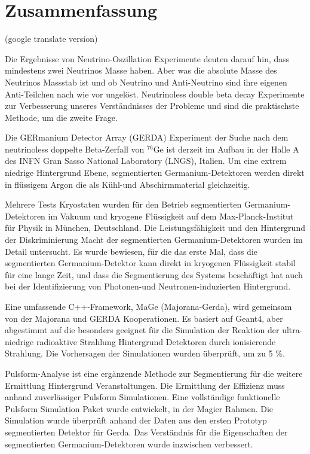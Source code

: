 \section*{Zusammenfassung}
(google translate version)

Die Ergebnisse von Neutrino-Oszillation Experimente deuten darauf hin, dass mindestens zwei Neutrinos Masse haben. Aber was die absolute Masse des Neutrinos Massstab ist und ob Neutrino und Anti-Neutrino sind ihre eigenen Anti-Teilchen nach wie vor ungel\"ost. Neutrinoless double beta decay Experimente zur Verbesserung unseres Verst\"andnisses der Probleme und sind die praktischste Methode, um die zweite Frage.

Die GERmanium Detector Array (GERDA) Experiment der Suche nach dem neutrinoless doppelte Beta-Zerfall von $^{76}$Ge ist derzeit im Aufbau in der Halle A des INFN Gran Sasso National Laboratory (LNGS), Italien. Um eine extrem niedrige Hintergrund Ebene, segmentierten Germanium-Detektoren werden direkt in fl\"ussigem Argon die als K\"uhl-und Abschirmmaterial gleichzeitig.

Mehrere Tests Kryostaten wurden f\"ur den Betrieb segmentierten Germanium-Detektoren im Vakuum und kryogene Fl\"ussigkeit auf dem Max-Planck-Institut f\"ur Physik in M\"unchen, Deutschland. Die Leistungsf\"ahigkeit und den Hintergrund der Diskriminierung Macht der segmentierten Germanium-Detektoren wurden im Detail untersucht. Es wurde bewiesen, für die das erste Mal, dass die segmentierten Germanium-Detektor kann direkt in kryogenen Fl\"ussigkeit stabil f\"ur eine lange Zeit, und dass die Segmentierung des Systems besch\"aftigt hat auch bei der Identifizierung von Photonen-und Neutronen-induzierten Hintergrund.

Eine umfassende C++-Framework, MaGe (Majorana-Gerda), wird gemeinsam von der Majorana und GERDA Kooperationen. Es basiert auf Geant4, aber abgestimmt auf die besonders geeignet für die Simulation der Reaktion der ultra-niedrige radioaktive Strahlung Hintergrund Detektoren durch ionisierende Strahlung. Die Vorhersagen der Simulationen wurden \"uberpr\"uft, um zu 5 \%.

Pulsform-Analyse ist eine erg\"anzende Methode zur Segmentierung für die weitere Ermittlung Hintergrund Veranstaltungen. Die Ermittlung der Effizienz muss anhand zuverl\"assiger Pulsform Simulationen. Eine vollst\"andige funktionelle Pulsform Simulation Paket wurde entwickelt, in der Magier Rahmen. Die Simulation wurde \"uberpr\"uft anhand der Daten aus den ersten Prototyp segmentierten Detektor f\"ur Gerda. Das Verst\"andnis f\"ur die Eigenschaften der segmentierten Germanium-Detektoren wurde inzwischen verbessert.

\clearpage

